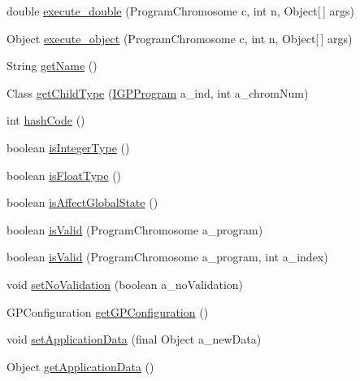 \begin{DoxyCompactItemize}
double \hyperlink{classorg_1_1jgap_1_1gp_1_1_command_gene_ad96a8c605329ea0d714b036f2f8db92d}{execute\-\_\-double} (Program\-Chromosome c, int n, Object\mbox{[}$\,$\mbox{]} args)
\item 
Object \hyperlink{classorg_1_1jgap_1_1gp_1_1_command_gene_afcdfe4dafc461cd01f2c813486a40911}{execute\-\_\-object} (Program\-Chromosome c, int n, Object\mbox{[}$\,$\mbox{]} args)
\item 
String \hyperlink{classorg_1_1jgap_1_1gp_1_1_command_gene_a49afdf9e494280ef38aa2c170cf85f0d}{get\-Name} ()
\item 
Class \hyperlink{classorg_1_1jgap_1_1gp_1_1_command_gene_a764c86ce05fec22c79f4092ecd6a2269}{get\-Child\-Type} (\hyperlink{interfaceorg_1_1jgap_1_1gp_1_1_i_g_p_program}{I\-G\-P\-Program} a\-\_\-ind, int a\-\_\-chrom\-Num)
\item 
int \hyperlink{classorg_1_1jgap_1_1gp_1_1_command_gene_a45fa4e15f4091faf9eaa038d6dd8d1a3}{hash\-Code} ()
\item 
boolean \hyperlink{classorg_1_1jgap_1_1gp_1_1_command_gene_a9835d9b07cdd539e814b1793fe2a2f8c}{is\-Integer\-Type} ()
\item 
boolean \hyperlink{classorg_1_1jgap_1_1gp_1_1_command_gene_af104512c27ffe6ed75b9120ecdd3c716}{is\-Float\-Type} ()
\item 
boolean \hyperlink{classorg_1_1jgap_1_1gp_1_1_command_gene_abc4db0d72cc2dd979e75f51cdca46529}{is\-Affect\-Global\-State} ()
\item 
boolean \hyperlink{classorg_1_1jgap_1_1gp_1_1_command_gene_a48219d5f6d59be04610fe5bdac58e86a}{is\-Valid} (Program\-Chromosome a\-\_\-program)
\item 
boolean \hyperlink{classorg_1_1jgap_1_1gp_1_1_command_gene_aff0babc30b2f341ee042c7ea33e9be14}{is\-Valid} (Program\-Chromosome a\-\_\-program, int a\-\_\-index)
\item 
void \hyperlink{classorg_1_1jgap_1_1gp_1_1_command_gene_ae8c2f83511f429ff904dc761f8e1be67}{set\-No\-Validation} (boolean a\-\_\-no\-Validation)
\item 
G\-P\-Configuration \hyperlink{classorg_1_1jgap_1_1gp_1_1_command_gene_a8093c30ad437344240369be5185698bb}{get\-G\-P\-Configuration} ()
\item 
void \hyperlink{classorg_1_1jgap_1_1gp_1_1_command_gene_ac94aeae2835caaf476e1cbecf179ba0f}{set\-Application\-Data} (final Object a\-\_\-new\-Data)
\item 
Object \hyperlink{classorg_1_1jgap_1_1gp_1_1_command_gene_ae92c8f24a90acf8721ac6e229bdb03d6}{get\-Application\-Data} ()

\end{DoxyCompactItemize}
